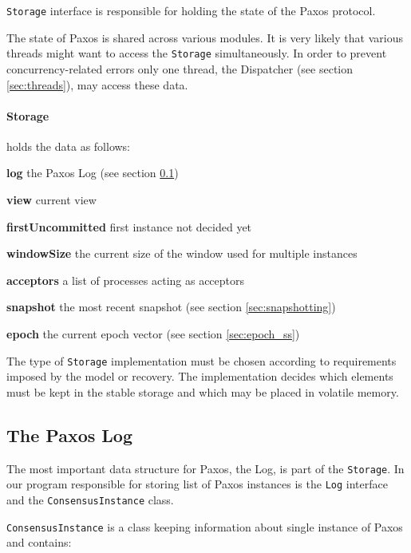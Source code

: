 \texttt{Storage} interface is responsible for holding the state of the Paxos protocol.

The state of Paxos is shared across various modules.
It is very likely that various threads might want to access the \texttt{Storage} simultaneously. In order to prevent concurrency-related errors only one thread, the Dispatcher (see section \ref{sec:threads}), may access these data. 

\paragraph{\normalfont \ttfamily Storage}
holds the data as follows:
\begin{tightList}[\setlength{\labelwidth}{0em}]
  \item[\textbf{log}] the Paxos Log (see section \ref{subsec:the_paxos_log})
  \item[\textbf{view}] current view
  \item[\textbf{firstUncommitted}] first instance not decided yet
  \item[\textbf{windowSize}] the current size of the window used for multiple instances
  \item[\textbf{acceptors}] a list of processes acting as acceptors
  \item[\textbf{snapshot}] the most recent snapshot (see section \ref{sec:snapshotting})
  \item[\textbf{epoch}] the current epoch vector (see section \ref{sec:epoch_ss})
\end{tightList}

\strut

The type of \texttt{Storage} implementation must be chosen according to requirements imposed by the model or recovery.
The implementation decides which elements must be kept in the stable storage and which may be placed in volatile memory.

\subsection{The Paxos Log}
\label{subsec:the_paxos_log}

The most important data structure for Paxos, the Log, is part of the \texttt{Storage}.
In our program responsible for storing list of Paxos instances is the \texttt{Log} interface and the \texttt{Con\-sen\-susInstance} class.

\texttt{ConsensusInstance} is a class keeping information about single instance of Paxos and contains:

